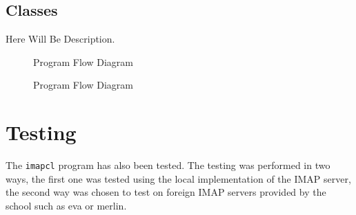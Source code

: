 \documentclass[a4paper,11pt]{article}
\begin{document}
\newpage
\subsection{Classes}
Here Will Be Description.

\begin{figure}[H]
    \centering
    \caption{Program Flow Diagram}
    \label{figure:client-config}
\end{figure}

\begin{figure}[H]
    \centering
    \caption{Program Flow Diagram}
    \label{figure:imap-clients}
\end{figure}

\newpage

\section{Testing}
The \verb!imapcl! program has also been tested. The testing was performed in two ways, 
the first one was tested using the local implementation of the IMAP server, the second 
way was chosen to test on foreign IMAP servers provided by the school such as eva or merlin.
\end{document}
